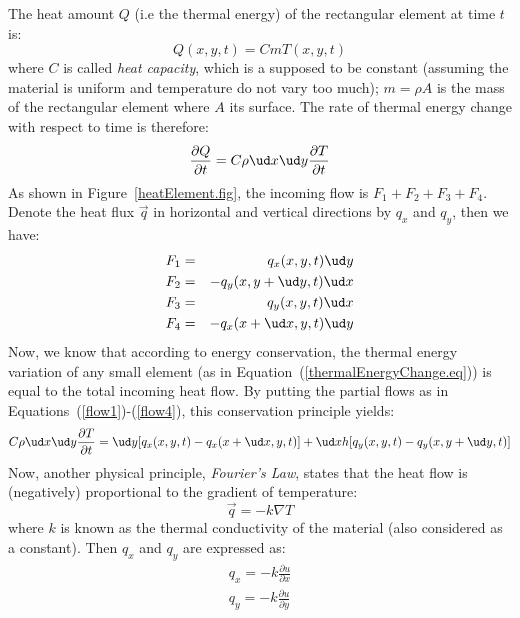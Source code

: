 \noindent The heat amount $Q$ (i.e the thermal energy) of the rectangular element at time $t$ is: 
\begin{equation}
Q(x,y,t)=C m T(x,y,t)
\end{equation}
where $C$ is called \emph{heat capacity}, which is a supposed to be constant (assuming the material is uniform and temperature do not vary too much); $m = \rho A$ is the mass of the rectangular element where $A$ its surface.
The rate of thermal energy change with respect to time is therefore:
\begin{equation}\label{thermalEnergyChange.eq}
\frac{\partial Q}{\partial t} = C\rho \ud x \ud y\frac{\partial T}{\partial t}
\end{equation}
As shown in Figure~\ref{heatElement.fig}, the incoming flow is $F_1 + F_2 + F_3 + F_4$. Denote the heat flux $\vec q$ in horizontal and vertical directions by $q_x$ and $q_y$, then we have:
\begin{eqnarray} %
F_1 &=& q_x(x,y,t)\ud y\label{flow1}\\
F_2 &=& -q_y(x,y+\ud y,t)\ud x\label{flow2}\\
F_3 &=& q_y(x,y,t)\ud x\label{flow3}\\
F_4 &=& -q_x(x+\ud x,y,t)\ud y\label{flow4}
\end{eqnarray}
Now, we know that according to energy conservation, the thermal energy variation of any small element (as in Equation~(\ref{thermalEnergyChange.eq})) is equal to the total incoming heat flow.  By putting the partial flows as in Equations~(\ref{flow1})-(\ref{flow4}), this conservation principle yields:
\begin{equation}\label{thermalEnergyChange.eq2}
C\rho \ud x \ud y\frac{\partial T}{\partial t} = \ud y [q_x(x,y,t)-q_x(x+\ud x,y,t)]+\ud xh[q_y(x,y,t)-q_y(x,y+\ud y,t)]
\end{equation}
Now, another physical principle, \emph{Fourier's Law}, states that the heat flow is (negatively) proportional to the gradient of temperature:
\begin{equation}\label{FourierLaw.eq}
\vec q = -k\nabla T
\end{equation}
where $k$ is known as the thermal conductivity of the material (also considered as a constant). Then $q_x$ and $q_y$ are expressed as:
\begin{equation}
\begin{split}
q_x=-k\frac{\partial u}{\partial x}\\
q_y=-k\frac{\partial u}{\partial y}
\end{split}
\end{equation}
